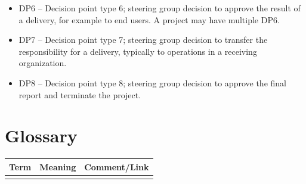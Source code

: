 \documentclass{article}
\begin{document}
\begin{appendices}
\begin{itemize}
\item DP6 – Decision point type 6; steering group decision to approve the result of a delivery, for example to end users. A project may have multiple DP6.

\item DP7 – Decision point type 7; steering group decision to transfer the responsibility for a delivery, typically to operations in a receiving organization.

\item DP8 – Decision point type 8; steering group decision to approve the final report and terminate the project.

\end{itemize}

\section{Glossary}

\begin{tabular}{l|l|l}
Term & Meaning & Comment/Link \\ \hline
 & &  \\ \hline
\end{tabular}

\end{appendices}
\end{document}
